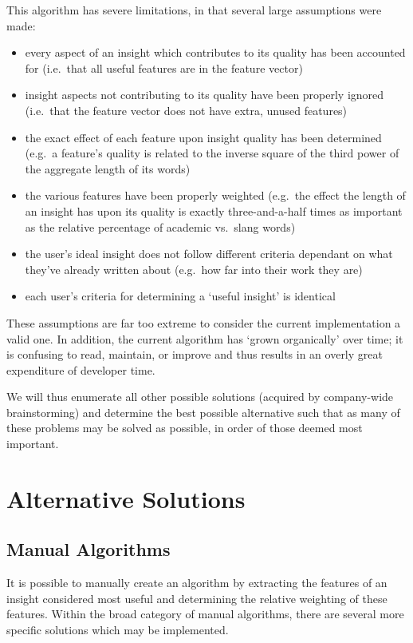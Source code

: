 \documentclass[12pt]{article}
\begin{document}
This algorithm has severe limitations, in that several large assumptions were made:
\begin{itemize}
\item every aspect of an insight which contributes to its quality has been accounted for (i.e.\ that all useful features are in the feature vector)
\item insight aspects not contributing to its quality have been properly ignored (i.e.\ that the feature vector does not have extra, unused features)
\item the exact effect of each feature upon insight quality has been determined (e.g.\ a feature's quality is related to the inverse square of the third power of the aggregate length of its words)
\item the various features have been properly weighted (e.g.\ the effect the length of an insight has upon its quality is exactly three-and-a-half times as important as the relative percentage of academic vs.\ slang words)
\item the user's ideal insight does not follow different criteria dependant on what they've already written about (e.g.\ how far into their work they are)
\item each user's criteria for determining a `useful insight' is identical
\end{itemize}

These assumptions are far too extreme to consider the current implementation a valid one. In addition, the current algorithm has `grown organically' over time; it is confusing to read, maintain, or improve and thus results in an overly great expenditure of developer time.

We will thus enumerate all other possible solutions (acquired by company-wide brainstorming) and determine the best possible alternative such that as many of these problems may be solved as possible, in order of those deemed most important.
\newpage


\section{Alternative Solutions}
\subsection{Manual Algorithms}
It is possible to manually create an algorithm by extracting the features of an insight considered most useful and determining the relative weighting of these features. Within the broad category of manual algorithms, there are several more specific solutions which may be implemented.
\end{document}
